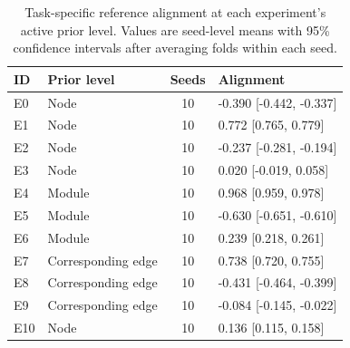 \begin{table}
\caption{Task-specific reference alignment at each experiment's active prior level. Values are seed-level means with 95\% confidence intervals after averaging folds within each seed.}
\label{tab:active_prior_alignment}
\begin{tabular}{llcl}
\toprule
ID & Prior level & Seeds & Alignment \\
\midrule
E0 & Node & 10 & -0.390 [-0.442, -0.337] \\
E1 & Node & 10 & 0.772 [0.765, 0.779] \\
E2 & Node & 10 & -0.237 [-0.281, -0.194] \\
E3 & Node & 10 & 0.020 [-0.019, 0.058] \\
E4 & Module & 10 & 0.968 [0.959, 0.978] \\
E5 & Module & 10 & -0.630 [-0.651, -0.610] \\
E6 & Module & 10 & 0.239 [0.218, 0.261] \\
E7 & Corresponding edge & 10 & 0.738 [0.720, 0.755] \\
E8 & Corresponding edge & 10 & -0.431 [-0.464, -0.399] \\
E9 & Corresponding edge & 10 & -0.084 [-0.145, -0.022] \\
E10 & Node & 10 & 0.136 [0.115, 0.158] \\
\bottomrule
\end{tabular}
\end{table}
